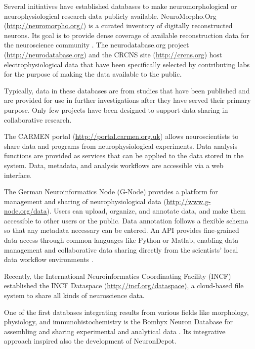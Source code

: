 \documentclass{frontiersSCNS} %
\begin{document}
Several initiatives have established databases to make neuromorphological or
neurophysiological research data publicly available.  NeuroMorpho.Org
(\url{http://neuromorpho.org/}) is a curated inventory of digitally
reconstructed neurons. Its goal is to provide dense coverage of available
reconstruction data for the neuroscience community \citep{Ascoli2007}.  The
neurodatabase.org project (\url{http://neurodatabase.org}) and the CRCNS site
(\url{http://crcns.org}) host electrophysiological data that have been
specifically selected by contributing labs for the purpose of making the data
available to the public.

Typically, data in these databases are from studies that have been published
and are provided for use in further investigations after they have served their
primary purpose.  Only few projects have been designed to support data sharing
in collaborative research.

The CARMEN portal (\url{http://portal.carmen.org.uk}) allows neuroscientists to
share data and programs from neurophysiological experiments.  Data analysis
functions are provided as services that can be applied to the data stored in
the system.  Data, metadata, and analysis workflows are accessible via a web
interface.

The German Neuroinformatics Node (G-Node) provides a platform for management
and sharing of neurophysiological data (\url{http://www.g-node.org/data}).
Users can upload, organize, and annotate data, and make them accessible to
other users or the public.  Data annotation follows a flexible schema \citep{Grewe2011} so that any metadata necessary can be entered.  An API provides
fine-grained data access through common languages like Python or Matlab,
enabling data management and collaborative data sharing directly from the
scientists' local data workflow environments \citep[][under
review]{Sobolev2014}.

Recently, the International Neuroinformatics Coordinating Facility (INCF)
established the INCF Dataspace (\url{http://incf.org/dataspace}), a cloud-based
file system to share all kinds of neuroscience data.

One of the first databases integrating results from various fields like
morphology, physiology, and immunohistochemistry is the Bombyx Neuron Database
for assembling and sharing experimental and analytical data \citep{Kazawa2008}.
Its integrative approach inspired also the development of NeuronDepot.

\end{document}

